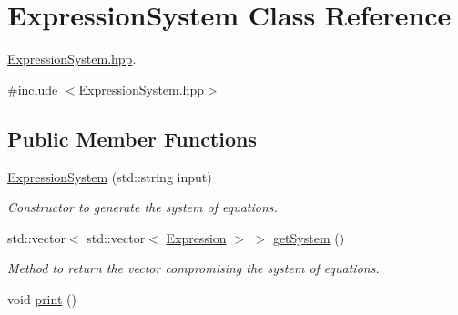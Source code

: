 \hypertarget{class_expression_system}{}\section{Expression\+System Class Reference}
\label{class_expression_system}


\hyperlink{_expression_system_8hpp_source}{Expression\+System.\+hpp}.  




{\ttfamily \#include $<$Expression\+System.\+hpp$>$}

\subsection*{Public Member Functions}
\begin{DoxyCompactItemize}
\item 
\hyperlink{class_expression_system_a008b0717293f7cb6aafd808c40cc805b}{Expression\+System} (std\+::string input)\hypertarget{class_expression_system_a008b0717293f7cb6aafd808c40cc805b}{}\label{class_expression_system_a008b0717293f7cb6aafd808c40cc805b}

\begin{DoxyCompactList}\small\item\em Constructor to generate the system of equations. \end{DoxyCompactList}\item 
std\+::vector$<$ std\+::vector$<$ \hyperlink{class_expression}{Expression} $>$ $>$ \hyperlink{class_expression_system_a3d6806b0492c2e5f67aab0932eedf61a}{get\+System} ()\hypertarget{class_expression_system_a3d6806b0492c2e5f67aab0932eedf61a}{}\label{class_expression_system_a3d6806b0492c2e5f67aab0932eedf61a}

\begin{DoxyCompactList}\small\item\em Method to return the vector compromising the system of equations. \end{DoxyCompactList}\item 
void \hyperlink{class_expression_system_a44cbd0462d855756ca2640c9dbb10965}{print} ()\hypertarget{class_expression_system_a44cbd0462d855756ca2640c9dbb10965}{}\label{class_expression_system_a44cbd0462d855756ca2640c9dbb10965}


\end{DoxyCompactItemize}
